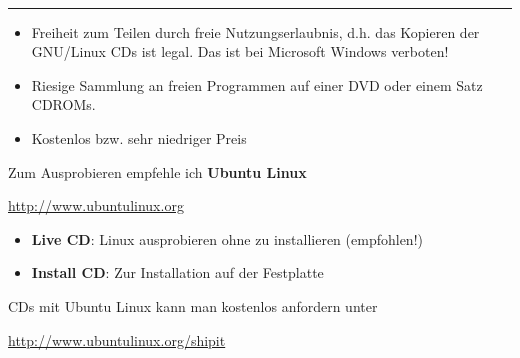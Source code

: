 \documentclass[11pt]{article}
\begin{document}
\begin{minipage}[t]{7cm}
\hfill {\Large{}}\\
\hrule

\medskip


\begin{itemize}
  
\item Freiheit zum Teilen durch freie Nutzungserlaubnis, d.h. das
  Kopieren der GNU/Linux CDs ist legal. Das ist bei Microsoft Windows verboten!

\item Riesige Sammlung an freien Programmen auf einer DVD oder einem Satz
  CDROMs.

\item Kostenlos bzw. sehr niedriger Preis 
\end{itemize}

Zum Ausprobieren empfehle ich {\bf Ubuntu Linux}

\begin{center}
      \url{http://www.ubuntulinux.org}
\end{center}

\begin{itemize}
\item {\bf Live CD}: Linux ausprobieren ohne zu installieren (empfohlen!)
\item {\bf Install CD}: Zur Installation auf der Festplatte
\end{itemize}

CDs mit Ubuntu Linux kann man kostenlos anfordern unter

\bigskip

\centerline{\url{http://www.ubuntulinux.org/shipit}}



\end{minipage}
\hskip 12mm
\hskip 12mm
\end{document}
